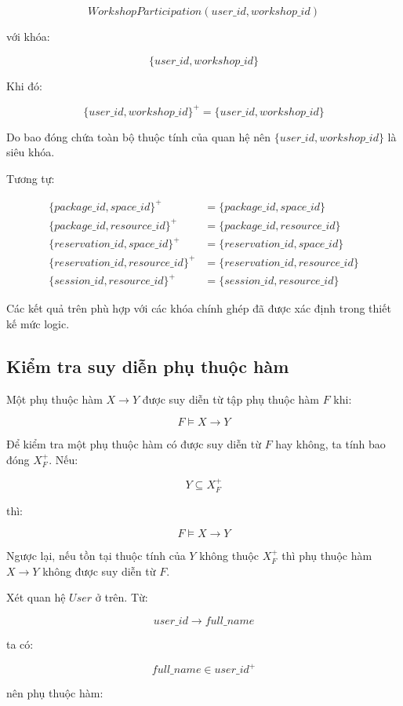 \[
WorkshopParticipation(user\_id,workshop\_id)
\]

với khóa:

\[
\{user\_id,workshop\_id\}
\]

Khi đó:

\[
\{user\_id,workshop\_id\}^+
=
\{user\_id,workshop\_id\}
\]

Do bao đóng chứa toàn bộ thuộc tính của quan hệ nên
$\{user\_id,workshop\_id\}$ là siêu khóa.

Tương tự:

\[
\begin{aligned}
	\{package\_id,space\_id\}^+
	&= \{package\_id,space\_id\}\\
	\{package\_id,resource\_id\}^+
	&= \{package\_id,resource\_id\}\\
	\{reservation\_id,space\_id\}^+
	&= \{reservation\_id,space\_id\}\\
	\{reservation\_id,resource\_id\}^+
	&= \{reservation\_id,resource\_id\}\\
	\{session\_id,resource\_id\}^+
	&= \{session\_id,resource\_id\}
\end{aligned}
\]

Các kết quả trên phù hợp với các khóa chính ghép đã được xác định trong
thiết kế mức logic.

\subsection{Kiểm tra suy diễn phụ thuộc hàm}

Một phụ thuộc hàm $X \rightarrow Y$ được suy diễn từ tập phụ thuộc hàm $F$
khi:

\[
F \models X \rightarrow Y
\]

Để kiểm tra một phụ thuộc hàm có được suy diễn từ $F$ hay không, ta tính
bao đóng $X^+_F$. Nếu:

\[
Y \subseteq X^+_F
\]

thì:

\[
F \models X \rightarrow Y
\]

Ngược lại, nếu tồn tại thuộc tính của $Y$ không thuộc $X^+_F$ thì phụ thuộc
hàm $X \rightarrow Y$ không được suy diễn từ $F$.

Xét quan hệ $User$ ở trên. Từ:

\[
user\_id \rightarrow full\_name
\]

ta có:

\[
full\_name \in user\_id^+
\]

nên phụ thuộc hàm:

